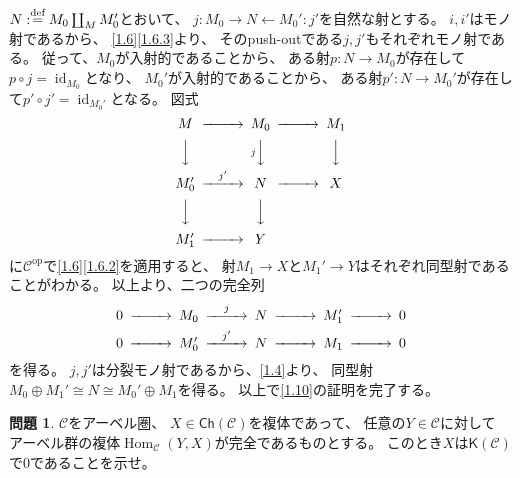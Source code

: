 \documentclass[uplatex,dvipdfmx]{jsarticle}
\makeatletter
\theoremstyle{definition}
\newtheorem{prob}[prob]{問題}
\renewenvironment{proof}[1][\proofname]{
  \pushQED{\qed}%
  \normalfont \topsep6\p@\@plus6\p@\relax
  \trivlist
  \item[\hskip\labelsep
    #1\@addpunct{\textbf{.}}]\ignorespaces
}{%
  \popQED\endtrivlist\@endpefalse
}
\providecommand{\proofname}{証明}
\DeclareMathOperator{\Hom}{\mathrm{Hom}}
\DeclareMathOperator{\id}{\mathrm{id}}
\newcommand{\op}{\mathrm{op}}
\newcommand{\Ch}{\mathsf{Ch}}
\newcommand{\sfK}{\mathsf{K}}
\newcommand\mcC{\mathcal{C}}
\def\dfn{:\overset{\mbox{{\scriptsize def}}}{=}}
\makeatother
\begin{document}
\begin{proof}
  \(N\dfn M_0\coprod_M M_0'\)とおいて、
  \(j:M_0 \to N \gets M_0':j'\)を自然な射とする。
  \(i,i'\)はモノ射であるから、
  \autoref{1.6}\ref{1.6.3}より、
  そのpush-outである\(j,j'\)もそれぞれモノ射である。
  従って、\(M_0\)が入射的であることから、
  ある射\(p:N\to M_0\)が存在して\(p\circ j = \id_{M_0}\)となり、
  \(M_0'\)が入射的であることから、
  ある射\(p':N\to M_0'\)が存在して\(p'\circ j' = \id_{M_0'}\)となる。
  図式
  \[
  \begin{CD}
    M @>>> M_0 @>>> M_1 \\
    @VVV @V j VV @VVV \\
    M_0' @> j' >> N @>>> X \\
    @VVV @VVV @. \\
    M_1' @>>> Y @.
  \end{CD}
  \]
  に\(\mcC^{\op}\)で\autoref{1.6}\ref{1.6.2}を適用すると、
  射\(M_1\to X\)と\(M_1'\to Y\)はそれぞれ同型射であることがわかる。
  以上より、二つの完全列
  \[
  \begin{CD}
    0 @>>> M_0 @> j >> N @>>> M_1' @>>> 0 \\
    0 @>>> M_0' @> j' >> N @>>> M_1 @>>> 0
  \end{CD}
  \]
  を得る。
  \(j,j'\)は分裂モノ射であるから、\autoref{1.4}より、
  同型射\(M_0\oplus M_1' \cong N \cong M_0'\oplus M_1\)を得る。
  以上で\autoref{1.10}の証明を完了する。
\end{proof}








\begin{prob}\label{1.11}
  \(\mcC\)をアーベル圏、
  \(X\in \Ch(\mcC)\)を複体であって、
  任意の\(Y\in \mcC\)に対して
  アーベル群の複体\(\Hom_{\mcC}(Y,X)\)が完全であるものとする。
  このとき\(X\)は\(\sfK(\mcC)\)で\(0\)であることを示せ。
\end{prob}
\end{document}
